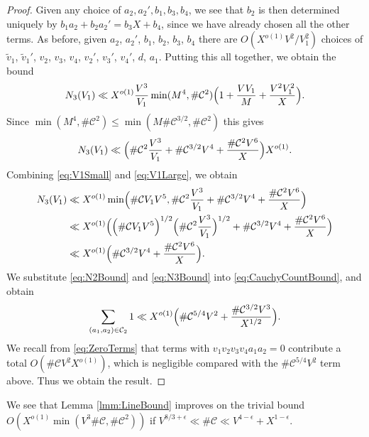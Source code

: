 \documentclass[10pt]{amsart}
\theoremstyle{plain}
\numberwithin{sblmm}{thrm}
\numberwithin{equation}{section}
\begin{document}
\begin{proof}
Given any choice of $a_2,a_2',b_1,b_3,b_4$, we see that $b_2$ is then determined uniquely by $b_1a_2+b_2a_2'=b_3X+b_4$, since we have already chosen all the other terms. As before, given $a_2$, $a_2'$, $b_1$, $b_2$, $b_3$, $b_4$ there are $O(X^{o(1)}V^2/V_1^2)$ choices of $\tilde{v}_1$, $\tilde{v}_1'$, $v_2$, $v_3$, $v_4$, $v_2'$, $v_3'$, $v_4'$, $d$, $a_1$. Putting this all together, we obtain the bound
%
\[
N_3(V_1)\ll X^{o(1)}\frac{V^3}{V_1}\min(M^4,\#\mathcal{C}^2)\Bigl(1+\frac{V V_1}{M}+\frac{V^2V_1^2}{X}\Bigr).
\]
Since $\min(M^4,\#\mathcal{C}^2)\le \min(M\#\mathcal{C}^{3/2},\#\mathcal{C}^2)$ this gives
\begin{equation}
N_3(V_1)\ll \Bigl(\#\mathcal{C}^2\frac{V^3}{V_1}+\#\mathcal{C}^{3/2}V^4+\frac{\#\mathcal{C}^2V^6}{X}\Bigr)X^{o(1)}.
\label{eq:V1Large}
\end{equation}
%
Combining \eqref{eq:V1Small} and \eqref{eq:V1Large}, we obtain
%
\begin{align}
N_3(V_1)&\ll X^{o(1)}\min\Bigl(\#\mathcal{C} V_1 V^5,\#\mathcal{C}^2\frac{V^3}{V_1}+\#\mathcal{C}^{3/2}V^4+\frac{\#\mathcal{C}^2V^6}{X}\Bigr)\nonumber\\
&\ll X^{o(1)}\Bigl(\Bigl(\#\mathcal{C} V_1 V^5\Bigr)^{1/2}\Bigl(\#\mathcal{C}^2\frac{V^3}{V_1}\Bigr)^{1/2}+\#\mathcal{C}^{3/2}V^4+\frac{\#\mathcal{C}^2V^6}{X}\Bigr)\nonumber\\
&\ll X^{o(1)}\Bigl(\#\mathcal{C}^{3/2}V^4+\frac{\#\mathcal{C}^2V^6}{X}\Bigr).
\label{eq:N3Bound}
\end{align}
%
We substitute \eqref{eq:N2Bound} and \eqref{eq:N3Bound} into \eqref{eq:CauchyCountBound}, and obtain
\[
\sum_{\substack{(a_1,a_2)\in\mathcal{C}_2}}1\ll X^{o(1)}\Bigl(\#\mathcal{C}^{5/4}V^2+\frac{\#\mathcal{C}^{3/2}V^{3}}{X^{1/2}}\Bigr).
\]
We recall from \eqref{eq:ZeroTerms} that terms with $v_1v_2v_3v_4a_1a_2=0$ contribute a total $O(\#\mathcal{C}V^2X^{o(1)})$, which is negligible compared with the $\#\mathcal{C}^{5/4}V^2$ term above. Thus we obtain the result.
%
\end{proof}
%
%
%
We see that Lemma \ref{lmm:LineBound} improves on the trivial bound $O(X^{o(1)}\min(V^3\#\mathcal{C},\#\mathcal{C}^2))$ if $V^{8/3+\epsilon}\ll \#\mathcal{C}\ll V^{4-\epsilon}+X^{1-\epsilon}$.
%
%
%
%
\end{document}
